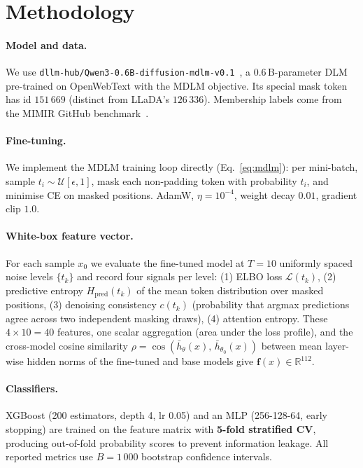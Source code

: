 \documentclass{article}
\begin{document}
\section{Methodology}
\label{sec:method}

\paragraph{Model and data.}
We use \texttt{dllm-hub/Qwen3-0.6B-diffusion-mdlm-v0.1}~\citep{qwen2025},
a 0.6\,B-parameter DLM pre-trained on OpenWebText with the MDLM objective.
Its special mask token has id $151\,669$ (distinct from LLaDA's $126\,336$).
Membership labels come from the MIMIR GitHub benchmark~\citep{duan2024mimir}.

\paragraph{Fine-tuning.}
We implement the MDLM training loop directly (Eq.~\ref{eq:mdlm}):
per mini-batch, sample $t_i\!\sim\!\mathcal{U}[\epsilon,1]$, mask each
non-padding token with probability $t_i$, and minimise CE on masked positions.
AdamW, $\eta\!=\!10^{-4}$, weight decay $0.01$, gradient clip $1.0$.

\paragraph{White-box feature vector.}
For each sample $x_0$ we evaluate the fine-tuned model at $T\!=\!10$ uniformly
spaced noise levels $\{t_k\}$ and record four signals per level:
(1) ELBO loss $\mathcal{L}(t_k)$,
(2) predictive entropy $H_{\mathrm{pred}}(t_k)$ of the mean token distribution
over masked positions,
(3) denoising consistency $c(t_k)$ (probability that argmax predictions agree
across two independent masking draws),
(4) attention entropy.
These $4\times10=40$ features, one scalar aggregation (area under the
loss profile), and the cross-model cosine similarity
$\rho = \cos(\bar{h}_\theta(x),\,\bar{h}_{\theta_0}(x))$ between mean
layer-wise hidden norms of the fine-tuned and base models give
$\mathbf{f}(x)\in\mathbb{R}^{112}$.

\paragraph{Classifiers.}
XGBoost (200 estimators, depth 4, lr 0.05) and an MLP (256-128-64, early stopping)
are trained on the feature matrix with \textbf{5-fold stratified CV},
producing out-of-fold probability scores to prevent information leakage.
All reported metrics use $B=1\,000$ bootstrap confidence intervals.
\end{document}
